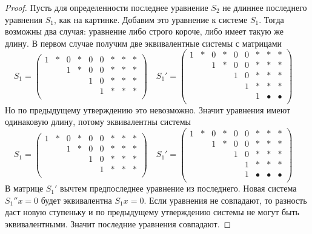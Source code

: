 \begin{proof}
Пусть для определенности последнее уравнение $S_2$ не длиннее последнего уравнения $S_1$, как на картинке.
Добавим это уравнение к системе $S_1$.
Тогда возможны два случая: уравнение либо строго короче, либо имеет такую же длину.
В первом случае получим две эквивалентные системы с матрицами
\[
S_1 = 
\begin{pmatrix}
{1}&{*}&{0}&{*}&{0}&{0}&{*}&{*}&{*}\\
{}&{}&{1}&{*}&{0}&{0}&{*}&{*}&{*}\\
{}&{}&{}&{}&{1}&{0}&{*}&{*}&{*}\\
{}&{}&{}&{}&{}&{1}&{*}&{*}&{*}\\
\end{pmatrix}\quad
S_1' = 
\begin{pmatrix}
{1}&{*}&{0}&{*}&{0}&{0}&{*}&{*}&{*}\\
{}&{}&{1}&{*}&{0}&{0}&{*}&{*}&{*}\\
{}&{}&{}&{}&{1}&{0}&{*}&{*}&{*}\\
{}&{}&{}&{}&{}&{1}&{*}&{*}&{*}\\
{}&{}&{}&{}&{}&{}&{1}&{\bullet}&{\bullet}\\
\end{pmatrix}\quad
\]
Но по предыдущему утверждению это невозможно.
Значит уравнения имеют одинаковую длину, потому эквивалентны системы
\[
S_1 = 
\begin{pmatrix}
{1}&{*}&{0}&{*}&{0}&{0}&{*}&{*}&{*}\\
{}&{}&{1}&{*}&{0}&{0}&{*}&{*}&{*}\\
{}&{}&{}&{}&{1}&{0}&{*}&{*}&{*}\\
{}&{}&{}&{}&{}&{1}&{*}&{*}&{*}\\
\end{pmatrix}\quad
S_1' = 
\begin{pmatrix}
{1}&{*}&{0}&{*}&{0}&{0}&{*}&{*}&{*}\\
{}&{}&{1}&{*}&{0}&{0}&{*}&{*}&{*}\\
{}&{}&{}&{}&{1}&{0}&{*}&{*}&{*}\\
{}&{}&{}&{}&{}&{1}&{*}&{*}&{*}\\
{}&{}&{}&{}&{}&{1}&{\bullet}&{\bullet}&{\bullet}\\
\end{pmatrix}\quad
\]
В матрице $S_1'$ вычтем предпоследнее уравнение из последнего.
Новая система  $S_1''x=0$ будет эквивалентна $S_1x =0$.
Если уравнения не совпадают, то разность даст новую ступеньку и по предыдущему утверждению системы не могут быть эквивалентными.
Значит последние уравнения совпадают.


\end{proof}
